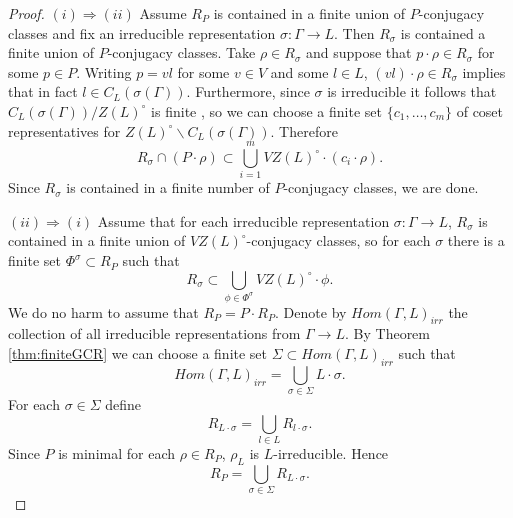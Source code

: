 \begin{proof}\quad

  $(i) \Rightarrow (ii)$ Assume $R_P$ is contained in a finite union of $P$-conjugacy classes and fix an irreducible representation $\sigma : \Gamma \rightarrow L$. Then $R_{\sigma}$ is contained a finite union of $P$-conjugacy classes. Take $\rho \in R_{\sigma}$ and suppose that $p \cdot \rho \in R_{\sigma}$ for some $p \in P$. Writing $p = vl$ for some $v \in V$ and some $l \in L$, $(vl) \cdot \rho \in R_{\sigma}$ implies that in fact $l \in C_L(\sigma(\Gamma))$. Furthermore, since $\sigma$ is irreducible it follows that $C_L(\sigma(\Gamma))/Z(L)^\circ$ is finite \cite[Lemma 6.2]{martin2003reductive}, so we can choose a finite set $\{c_1, \ldots, c_m\}$ of coset representatives for $Z(L)^\circ\backslash C_L(\sigma(\Gamma))$. Therefore
  \begin{displaymath}
    R_{\sigma} \cap (P \cdot \rho) \subset \bigcup_{i = 1}^{m} VZ(L)^\circ \cdot \left( c_i \cdot \rho \right).
  \end{displaymath}
  Since $R_{\sigma}$ is contained in a finite number of $P$-conjugacy classes, we are done.

  $(ii) \Rightarrow (i)$ Assume that for each irreducible representation $\sigma : \Gamma \rightarrow L$, $R_{\sigma}$ is contained in a finite union of $VZ(L)^\circ$-conjugacy classes, so for each $\sigma$ there is a finite set $\Phi^\sigma \subset R_P$ such that
  \begin{displaymath}
    R_\sigma \subset \bigcup_{\phi \in \Phi^\sigma} VZ(L)^\circ \cdot \phi.
  \end{displaymath}
  We do no harm to assume that $R_P = P \cdot R_P$. Denote by $Hom(\Gamma, L)_{irr}$ the collection of all irreducible representations from $\Gamma \rightarrow L$. By Theorem \ref{thm:finiteGCR} we can choose a finite set $\Sigma \subset Hom(\Gamma, L)_{irr}$ such that
  \begin{displaymath}
    Hom(\Gamma, L)_{irr} = \bigcup_{\sigma \in \Sigma} L \cdot \sigma.
  \end{displaymath}
  For each $\sigma \in \Sigma$ define 
  \begin{displaymath}
    R_{L \cdot \sigma} = \bigcup_{l \in L} R_{l \cdot \sigma}.
  \end{displaymath}
  Since $P$ is minimal for each $\rho \in R_P$, $\rho_L$ is $L$-irreducible. Hence
  \begin{displaymath}
    R_P = \bigcup_{\sigma \in \Sigma} R_{L \cdot \sigma}.
  \end{displaymath}


\end{proof}
